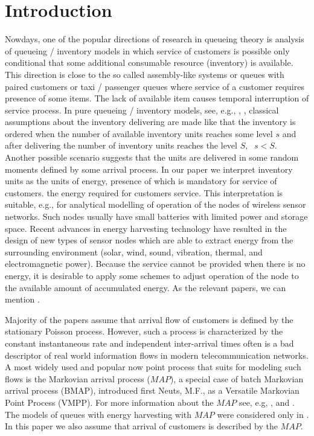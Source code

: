 \documentclass[12pt, a4paper]{article}
\begin{document}
\section{Introduction}
Nowdays, one of the popular directions of research in queueing theory is analysis of queueing / inventory models in which service of customers is possible only conditional that some additional consumable resource (inventory) is  available. This direction is close to the so called assembly-like systems or queues with paired customers or taxi / passenger queues where service of a customer requires presence of some items. The lack of available item causes temporal interruption of service process. In pure queueing / inventory models, see, e.g., \cite{kr1}, \cite{kr2}, classical assumptions about the inventory delivering are made like that the inventory is ordered when the number of available inventory units reaches some level $s$ and after delivering the number of inventory units reaches the level $S,\;$ $s<S.$ Another possible scenario suggests that the units are delivered in some random moments defined by some arrival process. In our paper we interpret inventory units as the units of energy, presence of which is mandatory for service of customers. the energy required for customers service. This interpretation is suitable, e.g., for analytical modelling of operation of the nodes of wireless sensor networks. Such nodes usually have small batteries with limited power and  storage
space.   Recent advances in energy harvesting technology have
resulted in the design of new types of sensor nodes which
are able to extract energy from the surrounding environment (solar, wind,
sound, vibration, thermal, and electromagnetic power).   Because the service cannot  be provided when there is no energy, it is desirable to apply some schemes to adjust operation of the node to the available amount of accumulated energy. As the relevant papers, we can mention \cite{a,b1,b2,cuy,d1,d2,d3,d4,g1,g2,kim1,kim2,p,s1,s2,t1,t2,u,y1,y2}.

Majority of the papers assume that arrival flow of customers is defined by the stationary Poisson process. However, such a process is characterized by the constant instantaneous rate and independent inter-arrival times often is  a bad descriptor of real world information flows in modern telecommunication networks. A most widely used and popular now  point process that  suits for modeling such flows is the Markovian arrival process ($MAP$), a special case of batch Markovian arrival process (BMAP), introduced first Neuts, M.F.,  as a Versatile
Markovian Point Process (VMPP).  For more information about the $MAP$ see, e.g, \cite{chak}, \cite{luk} and \cite{vd}. The models of queues with energy harvesting with $MAP$ were considered  only in \cite{b2,d1,d2,d3,d4,kim2}. In this paper we also assume that arrival of customers is described by the $MAP.$
\end{document}
